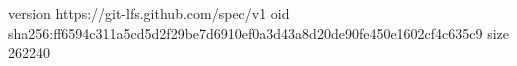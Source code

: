version https://git-lfs.github.com/spec/v1
oid sha256:ff6594c311a5cd5d2f29be7d6910ef0a3d43a8d20de90fe450e1602cf4c635c9
size 262240
